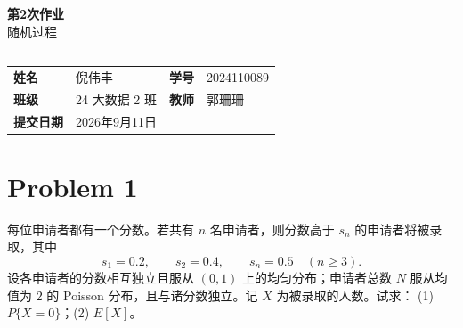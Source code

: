 \documentclass[12pt,a4paper]{article}
\newcommand{\course}{随机过程}
\newcommand{\homeworktitle}{第2次作业}
\newcommand{\studentname}{倪伟丰}
\newcommand{\studentid}{2024110089}
\newcommand{\classname}{24 大数据 2 班}
\newcommand{\teacher}{郭珊珊}
\newcommand{\duedate}{2026年9月11日}
\begin{document}
\begin{center}
  {\Huge\bfseries\color{mainblue}\homeworktitle}\\[0.6em]
  {\Large\course}\\[1.2em]
  {\color{linegray}\rule{0.9\textwidth}{0.8pt}}
\end{center}

\begin{infobox}
\begin{tabularx}{\textwidth}{>{\bfseries}p{2.2cm} X >{\bfseries}p{2.2cm} X}
姓名 & \studentname & 学号 & \studentid \\
班级 & \classname & 教师 & \teacher \\
提交日期 & \duedate &  &  \\
\end{tabularx}
\end{infobox}


\section{Problem 1}

每位申请者都有一个分数。若共有 $n$ 名申请者，则分数高于 $s_n$ 的申请者将被录取，其中
\[
s_1 = 0.2, \qquad s_2 = 0.4, \qquad s_n = 0.5 \quad (n \ge 3).
\]
设各申请者的分数相互独立且服从 $(0,1)$ 上的均匀分布；申请者总数 $N$ 服从均值为 $2$ 的 Poisson 分布，且与诸分数独立。记 $X$ 为被录取的人数。试求：
(1) $P\{X=0\}$；\quad (2) $E[X]$。
\end{document}
